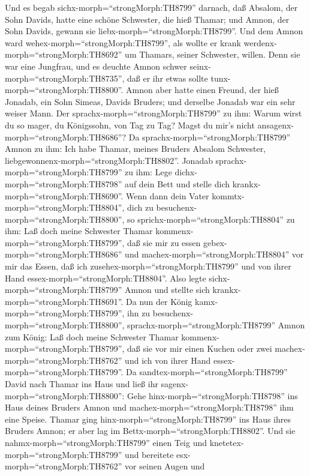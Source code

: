  Und es begab sichx-morph=``strongMorph:TH8799'' darnach,
daß Absalom, der Sohn Davids, hatte eine schöne Schwester, die hieß
Thamar; und Amnon, der Sohn Davids, gewann sie
liebx-morph=``strongMorph:TH8799''.  Und dem Amnon ward
wehex-morph=``strongMorph:TH8799'', als wollte er krank
werdenx-morph=``strongMorph:TH8692'' um Thamars, seiner Schwester,
willen. Denn sie war eine Jungfrau, und es deuchte Amnon schwer
seinx-morph=``strongMorph:TH8735'', daß er ihr etwas sollte
tunx-morph=``strongMorph:TH8800''.  Amnon aber hatte einen
Freund, der hieß Jonadab, ein Sohn Simeas, Davids Bruders; und derselbe
Jonadab war ein sehr weiser Mann.  Der
sprachx-morph=``strongMorph:TH8799'' zu ihm: Warum wirst du so mager, du
Königssohn, von Tag zu Tag? Magst du mir's nicht
ansagenx-morph=``strongMorph:TH8686''? Da
sprachx-morph=``strongMorph:TH8799'' Amnon zu ihm: Ich habe Thamar,
meines Bruders Absalom Schwester,
liebgewonnenx-morph=``strongMorph:TH8802''.  Jonadab
sprachx-morph=``strongMorph:TH8799'' zu ihm: Lege
dichx-morph=``strongMorph:TH8798'' auf dein Bett und stelle dich
krankx-morph=``strongMorph:TH8690''. Wenn dann dein Vater
kommtx-morph=``strongMorph:TH8804'', dich zu
besuchenx-morph=``strongMorph:TH8800'', so
sprichx-morph=``strongMorph:TH8804'' zu ihm: Laß doch meine Schwester
Thamar kommenx-morph=``strongMorph:TH8799'', daß sie mir zu essen
gebex-morph=``strongMorph:TH8686'' und
machex-morph=``strongMorph:TH8804'' vor mir das Essen, daß ich
zusehex-morph=``strongMorph:TH8799'' und von ihrer Hand
essex-morph=``strongMorph:TH8804''.  Also legte
sichx-morph=``strongMorph:TH8799'' Amnon und stellte sich
krankx-morph=``strongMorph:TH8691''. Da nun der König
kamx-morph=``strongMorph:TH8799'', ihn zu
besuchenx-morph=``strongMorph:TH8800'',
sprachx-morph=``strongMorph:TH8799'' Amnon zum König: Laß doch meine
Schwester Thamar kommenx-morph=``strongMorph:TH8799'', daß sie vor mir
einen Kuchen oder zwei machex-morph=``strongMorph:TH8762'' und ich von
ihrer Hand essex-morph=``strongMorph:TH8799''.  Da
sandtex-morph=``strongMorph:TH8799'' David nach Thamar ins Haus und ließ
ihr sagenx-morph=``strongMorph:TH8800'': Gehe
hinx-morph=``strongMorph:TH8798'' ins Haus deines Bruders Amnon und
machex-morph=``strongMorph:TH8798'' ihm eine Speise.  Thamar
ging hinx-morph=``strongMorph:TH8799'' ins Haus ihres Bruders Amnon; er
aber lag im Bettx-morph=``strongMorph:TH8802''. Und sie
nahmx-morph=``strongMorph:TH8799'' einen Teig und
knetetex-morph=``strongMorph:TH8799'' und bereitete
esx-morph=``strongMorph:TH8762'' vor seinen Augen und
